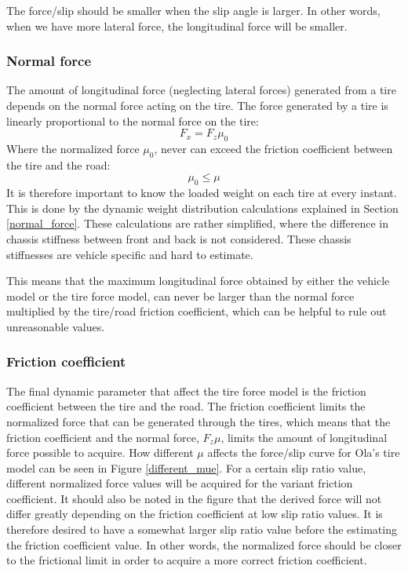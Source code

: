  The force/slip should be smaller when the slip angle is larger. In other words, when we have more lateral force, the longitudinal force will be smaller.

\subsubsection{Normal force}
The amount of longitudinal force (neglecting lateral forces) generated from a tire depends on the normal force acting on the tire. The force generated by a tire is linearly proportional to the normal force on the tire:
\begin{equation}
	F_{x} = F_{z}\mu_{0}
\end{equation}
Where the normalized force $ \mu_{0} $, never can exceed the friction coefficient between the tire and the road:
\begin{equation}
	\mu_{0} \leq \mu
\end{equation}
It is therefore important to know the loaded weight on each tire at every instant. This is done by the dynamic weight distribution calculations explained in Section \ref{normal_force}. These calculations are rather simplified, where the difference in chassis stiffness between front and back is not considered. These chassis stiffnesses are vehicle specific and hard to estimate. 

This means that the maximum longitudinal force obtained by either the vehicle model or the tire force model, can never be larger than the normal force multiplied by the tire/road friction coefficient, which can be helpful to rule out unreasonable values. 

\subsubsection{Friction coefficient}
\label{section_friction coefficient}
The final dynamic parameter that affect the tire force model is the friction coefficient between the tire and the road. The friction coefficient limits the normalized force that can be generated through the tires, which means that the friction coefficient and the normal force, $ F_{z}\mu $, limits the amount of longitudinal force possible to acquire. How different $ \mu $ affects the force/slip curve for Ola's tire model can be seen in Figure \ref{different_mue}. For a certain slip ratio value, different normalized force values will be acquired for the variant friction coefficient. It should also be noted in the figure that the derived force will not differ greatly depending on the friction coefficient at low slip ratio values. It is therefore desired to have a somewhat larger slip ratio value before the estimating the friction coefficient value. In other words, the normalized force should be closer to the frictional limit in order to acquire a more correct friction coefficient. 

